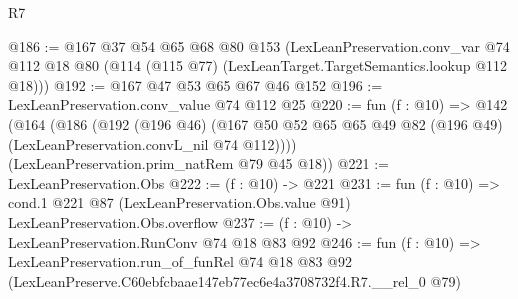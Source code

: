 \begin{lexlean}{R7}
\begin{coremodule}
@186 := @167
    @37
    @54
    @65
    @68
    @80
    @153
    (LexLeanPreservation.conv_var
      @74
      @112
      @18
      @80
      (@114 (@115 @77) (LexLeanTarget.TargetSemantics.lookup @112 @18)))
@192 := @167 @47 @53 @65 @67 @46 @152
@196 := LexLeanPreservation.conv_value @74 @112 @25
@220 := fun (f : @10) =>
  @142
    (@164
      (@186
        (@192
          (@196 @46)
          (@167 @50 @52 @65 @65 @49 @82 (@196 @49) (LexLeanPreservation.convL_nil @74 @112))))
      (LexLeanPreservation.prim_natRem @79 @45 @18))
@221 := LexLeanPreservation.Obs
@222 := (f : @10) -> @221
@231 := fun (f : @10) =>
  cond.{1} @221 @87 (LexLeanPreservation.Obs.value @91) LexLeanPreservation.Obs.overflow
@237 := (f : @10) -> LexLeanPreservation.RunConv @74 @18 @83 @92
@246 := fun (f : @10) =>
  LexLeanPreservation.run_of_funRel
    @74
    @18
    @83
    @92
    (LexLeanPreserve.C60ebfcbaae147eb77ec6e4a3708732f4.R7.__rel_0 @79)
\end{coremodule}
\end{lexlean}
